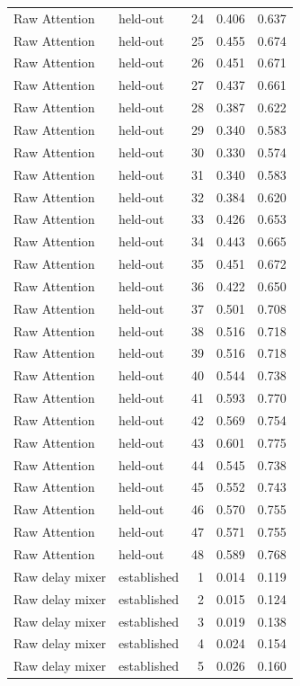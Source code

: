 \begin{tabular}{llrrr}
Raw Attention & held-out & 24 & 0.406 & 0.637 \\
Raw Attention & held-out & 25 & 0.455 & 0.674 \\
Raw Attention & held-out & 26 & 0.451 & 0.671 \\
Raw Attention & held-out & 27 & 0.437 & 0.661 \\
Raw Attention & held-out & 28 & 0.387 & 0.622 \\
Raw Attention & held-out & 29 & 0.340 & 0.583 \\
Raw Attention & held-out & 30 & 0.330 & 0.574 \\
Raw Attention & held-out & 31 & 0.340 & 0.583 \\
Raw Attention & held-out & 32 & 0.384 & 0.620 \\
Raw Attention & held-out & 33 & 0.426 & 0.653 \\
Raw Attention & held-out & 34 & 0.443 & 0.665 \\
Raw Attention & held-out & 35 & 0.451 & 0.672 \\
Raw Attention & held-out & 36 & 0.422 & 0.650 \\
Raw Attention & held-out & 37 & 0.501 & 0.708 \\
Raw Attention & held-out & 38 & 0.516 & 0.718 \\
Raw Attention & held-out & 39 & 0.516 & 0.718 \\
Raw Attention & held-out & 40 & 0.544 & 0.738 \\
Raw Attention & held-out & 41 & 0.593 & 0.770 \\
Raw Attention & held-out & 42 & 0.569 & 0.754 \\
Raw Attention & held-out & 43 & 0.601 & 0.775 \\
Raw Attention & held-out & 44 & 0.545 & 0.738 \\
Raw Attention & held-out & 45 & 0.552 & 0.743 \\
Raw Attention & held-out & 46 & 0.570 & 0.755 \\
Raw Attention & held-out & 47 & 0.571 & 0.755 \\
Raw Attention & held-out & 48 & 0.589 & 0.768 \\
Raw delay mixer & established & 1 & 0.014 & 0.119 \\
Raw delay mixer & established & 2 & 0.015 & 0.124 \\
Raw delay mixer & established & 3 & 0.019 & 0.138 \\
Raw delay mixer & established & 4 & 0.024 & 0.154 \\
Raw delay mixer & established & 5 & 0.026 & 0.160 \\

\end{tabular}

